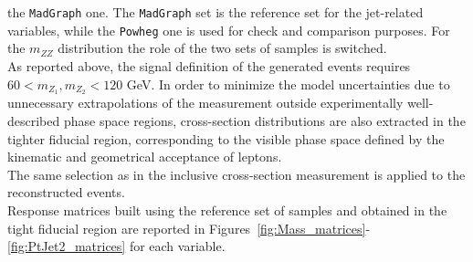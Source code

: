 the \texttt{MadGraph} one. The \texttt{MadGraph} set is the reference set for the jet-related variables,
while the  \texttt{Powheg} one is used for check and comparison purposes. For the $m_{ZZ}$ distribution the role of the two sets of samples is switched.\\
As reported above, the signal definition of the generated events requires $60 < m_{Z_1}, m_{Z_2} < 120$  GeV. 
In order to minimize the model uncertainties due to unnecessary extrapolations of the measurement outside experimentally well-described phase space regions, cross-section distributions are also extracted in the tighter fiducial region, corresponding to the visible phase space defined by the kinematic and geometrical acceptance of leptons.\\ 
The same selection as in the inclusive cross-section measurement is applied to the reconstructed events.\\ 
Response matrices built using the reference set of samples and obtained in the tight fiducial region are 
reported in Figures~\ref{fig:Mass_matrices}-%
\ref{fig:PtJet2_matrices} for each variable.\\
